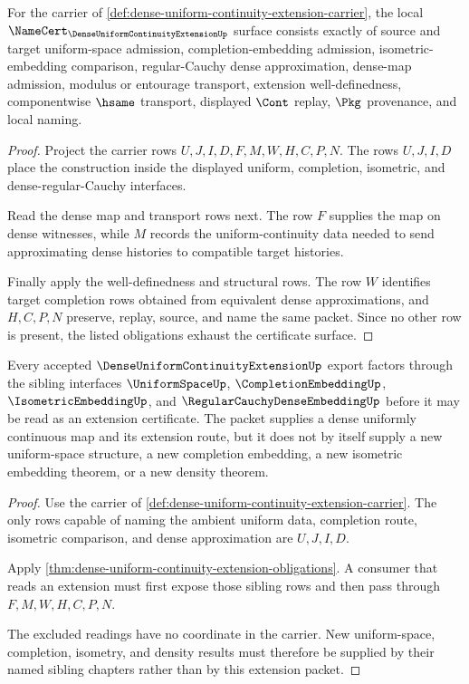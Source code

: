 \begin{theorem}
\label{thm:dense-uniform-continuity-extension-obligations}
For the carrier of \autoref{def:dense-uniform-continuity-extension-carrier}, the local $\NameCert_{\DenseUniformContinuityExtensionUp}$ surface consists exactly of source and target uniform-space admission, completion-embedding admission, isometric-embedding comparison, regular-Cauchy dense approximation, dense-map admission, modulus or entourage transport, extension well-definedness, componentwise $\hsame$ transport, displayed $\Cont$ replay, $\Pkg$ provenance, and local naming.
\end{theorem}
\begin{proof}
Project the carrier rows $U,J,I,D,F,M,W,H,C,P,N$. The rows $U,J,I,D$ place the construction inside the displayed uniform, completion, isometric, and dense-regular-Cauchy interfaces.

Read the dense map and transport rows next. The row $F$ supplies the map on dense witnesses, while $M$ records the uniform-continuity data needed to send approximating dense histories to compatible target histories.

Finally apply the well-definedness and structural rows. The row $W$ identifies target completion rows obtained from equivalent dense approximations, and $H,C,P,N$ preserve, replay, source, and name the same packet. Since no other row is present, the listed obligations exhaust the certificate surface.
\end{proof}

\begin{theorem}
\label{thm:dense-uniform-continuity-extension-sibling-dependency}
Every accepted $\DenseUniformContinuityExtensionUp$ export factors through the sibling interfaces $\UniformSpaceUp$, $\CompletionEmbeddingUp$, $\IsometricEmbeddingUp$, and $\RegularCauchyDenseEmbeddingUp$ before it may be read as an extension certificate. The packet supplies a dense uniformly continuous map and its extension route, but it does not by itself supply a new uniform-space structure, a new completion embedding, a new isometric embedding theorem, or a new density theorem.
\end{theorem}
\begin{proof}
Use the carrier of \autoref{def:dense-uniform-continuity-extension-carrier}. The only rows capable of naming the ambient uniform data, completion route, isometric comparison, and dense approximation are $U,J,I,D$.

Apply \autoref{thm:dense-uniform-continuity-extension-obligations}. A consumer that reads an extension must first expose those sibling rows and then pass through $F,M,W,H,C,P,N$.

The excluded readings have no coordinate in the carrier. New uniform-space, completion, isometry, and density results must therefore be supplied by their named sibling chapters rather than by this extension packet.
\end{proof}

